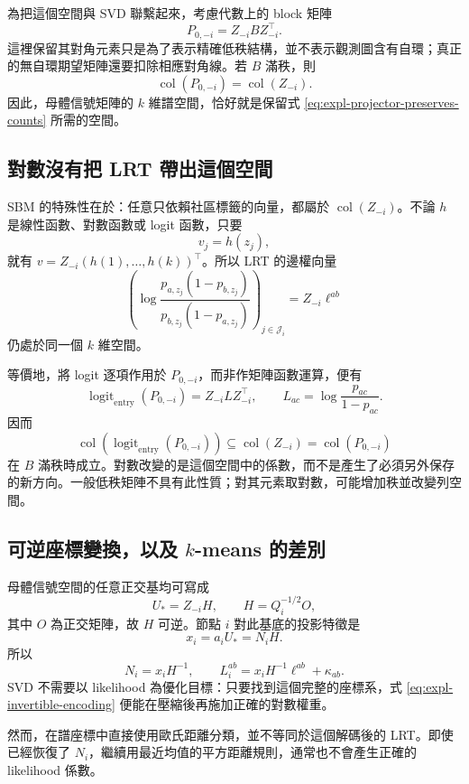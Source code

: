 \documentclass[11pt,a4paper]{article}
\theoremstyle{zhplain}
\numberwithin{equation}{section}
\begin{document}
為把這個空間與 SVD 聯繫起來，考慮代數上的 block 矩陣
\[
 P_{0,-i}=Z_{-i}BZ_{-i}^{\top}.
\]
這裡保留其對角元素只是為了表示精確低秩結構，並不表示觀測圖含有自環；真正的無自環期望矩陣還要扣除相應對角線。若 $B$ 滿秩，則
\[
 \operatorname{col}(P_{0,-i})=\operatorname{col}(Z_{-i}).
\]
因此，母體信號矩陣的 $k$ 維譜空間，恰好就是保留式 \eqref{eq:expl-projector-preserves-counts} 所需的空間。

\subsection{對數沒有把 LRT 帶出這個空間}

SBM 的特殊性在於：任意只依賴社區標籤的向量，都屬於 $\operatorname{col}(Z_{-i})$。不論 $h$ 是線性函數、對數函數或 logit 函數，只要
\[
 v_j=h(z_j),
\]
就有 $v=Z_{-i}(h(1),\ldots,h(k))^{\top}$。所以 LRT 的邊權向量
\[
 \left(\log\frac{p_{a,z_j}(1-p_{b,z_j})}
 {p_{b,z_j}(1-p_{a,z_j})}\right)_{j\in\mathcal J_i}
 =Z_{-i}\ell^{ab}
\]
仍處於同一個 $k$ 維空間。

等價地，將 logit 逐項作用於 $P_{0,-i}$，而非作矩陣函數運算，便有
\[
 \operatorname{logit}_{\mathrm{entry}}(P_{0,-i})
 =Z_{-i}LZ_{-i}^{\top},
 \qquad
 L_{ac}=\log\frac{p_{ac}}{1-p_{ac}}.
\]
因而
\[
 \operatorname{col}\!\left(
 \operatorname{logit}_{\mathrm{entry}}(P_{0,-i})\right)
 \subseteq\operatorname{col}(Z_{-i})
 =\operatorname{col}(P_{0,-i})
\]
在 $B$ 滿秩時成立。對數改變的是這個空間中的係數，而不是產生了必須另外保存的新方向。一般低秩矩陣不具有此性質；對其元素取對數，可能增加秩並改變列空間。

\subsection{可逆座標變換，以及 \texorpdfstring{\(k\)}{k}-means 的差別}

母體信號空間的任意正交基均可寫成
\[
 U_*=Z_{-i}H,
 \qquad
 H=Q_i^{-1/2}O,
\]
其中 $O$ 為正交矩陣，故 $H$ 可逆。節點 $i$ 對此基底的投影特徵是
\[
 x_i=a_iU_*=N_iH.
\]
所以
\begin{equation}
 \boxed{N_i=x_iH^{-1},\qquad
 L_i^{ab}=x_iH^{-1}\ell^{ab}+\kappa_{ab}.}
 \label{eq:expl-invertible-encoding}
\end{equation}
SVD 不需要以 likelihood 為優化目標：只要找到這個完整的座標系，式 \eqref{eq:expl-invertible-encoding} 便能在壓縮後再施加正確的對數權重。

然而，在譜座標中直接使用歐氏距離分類，並不等同於這個解碼後的 LRT。即使已經恢復了 $N_i$，繼續用最近均值的平方距離規則，通常也不會產生正確的 likelihood 係數。
\end{document}
